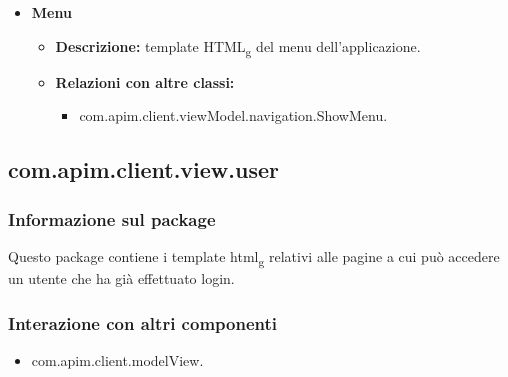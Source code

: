 {{{\begin{itemize}
\begin{itemize}
\begin{itemize}
							\item com.apim.client.viewModel.navigation.ShowRegistration.
						\end{itemize}
					\end{itemize}
				\item \textbf{Menu}
					\begin{itemize}
						\item \textbf{Descrizione:}  template HTML\textsubscript{g} del menu dell'applicazione.
						\item \textbf{Relazioni con altre classi:}
						\begin{itemize}
							\item com.apim.client.viewModel.navigation.ShowMenu.
						\end{itemize}
					\end{itemize}
			\end{itemize}
		}
	}
	\subsection{com.apim.client.view.user}{
		\subsubsection{Informazione sul package}{
			Questo package contiene i template html\textsubscript{g} relativi alle pagine a cui può accedere un utente che ha già effettuato login.
		}
		\subsubsection{Interazione con altri componenti}{
			\begin{itemize}
				\item com.apim.client.modelView.
			\end{itemize}
		}
}}
